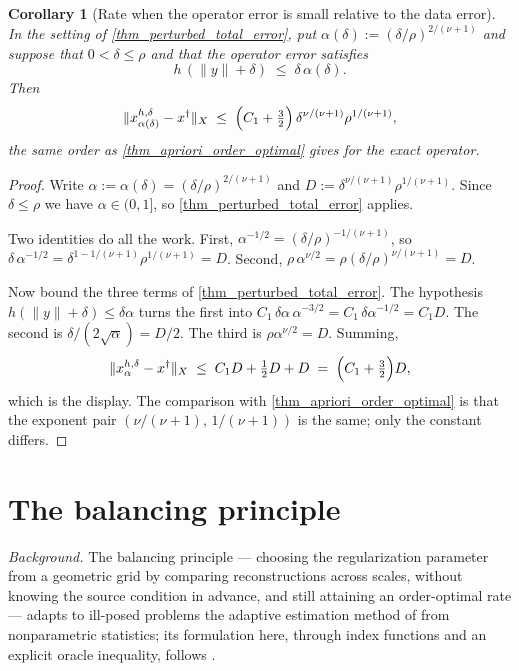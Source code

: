 \documentclass[a4paper]{report}
\theoremstyle{plain}
\newtheorem{corollary}[theorem]{Corollary}
\theoremstyle{definition}
\theoremstyle{remark}
\newcommand{\dg}{^{\dagger}}
\begin{document}
\begin{corollary}[Rate when the operator error is small relative to the data error]
  \label{cor_perturbed_rate}
  In the setting of \cref{thm_perturbed_total_error}, put
  $\alpha(\delta) := (\delta/\rho)^{2/(\nu+1)}$ and suppose that
  $0 < \delta \le \rho$ and that the operator error satisfies
  \[
    h\,(\|y\|+\delta) \;\le\; \delta\,\alpha(\delta) .
  \]
  Then
  \[
    \|x^{h,\delta}_{\alpha(\delta)} - x\dg\|_X \;\le\;
      \Bigl(C_1 + \tfrac{3}{2}\Bigr)\,\delta^{\nu/(\nu+1)}\rho^{1/(\nu+1)} ,
  \]
  the same order as \cref{thm_apriori_order_optimal} gives for the exact operator.
\end{corollary}
\begin{proof}
  Write $\alpha := \alpha(\delta) = (\delta/\rho)^{2/(\nu+1)}$ and
  $D := \delta^{\nu/(\nu+1)}\rho^{1/(\nu+1)}$.  Since $\delta \le \rho$ we have
  $\alpha \in (0,1]$, so \cref{thm_perturbed_total_error} applies.

  Two identities do all the work.  First,
  $\alpha^{-1/2} = (\delta/\rho)^{-1/(\nu+1)}$, so
  $\delta\,\alpha^{-1/2} = \delta^{1-1/(\nu+1)}\rho^{1/(\nu+1)} = D$.  Second,
  $\rho\,\alpha^{\nu/2} = \rho(\delta/\rho)^{\nu/(\nu+1)} = D$.

  Now bound the three terms of \cref{thm_perturbed_total_error}.  The hypothesis
  $h(\|y\|+\delta) \le \delta\alpha$ turns the first into
  $C_1\,\delta\alpha\,\alpha^{-3/2} = C_1\,\delta\alpha^{-1/2} = C_1D$.  The second is
  $\delta/(2\sqrt{\alpha}) = D/2$.  The third is $\rho\alpha^{\nu/2} = D$.  Summing,
  \[
    \|x^{h,\delta}_{\alpha} - x\dg\|_X \;\le\;
      C_1D + \tfrac{1}{2}D + D \;=\; \Bigl(C_1+\tfrac{3}{2}\Bigr)D ,
  \]
  which is the display.  The comparison with \cref{thm_apriori_order_optimal} is that the
  exponent pair $(\nu/(\nu+1),\,1/(\nu+1))$ is the same; only the constant differs.
\end{proof}


\chapter{The balancing principle}
\label{ch_22_balancing}

\noindent\emph{Background.} The balancing principle --- choosing the regularization
parameter from a geometric grid by comparing reconstructions across scales, without
knowing the source condition in advance, and still attaining an order-optimal rate ---
adapts to ill-posed problems the adaptive estimation method of \citet{Lepskii1990} from
nonparametric statistics; its formulation here, through index functions and an explicit
oracle inequality, follows \citet{MathePereverzev2003}.
\end{document}

